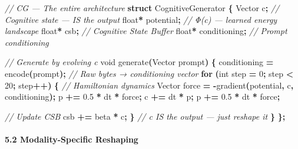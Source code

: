 \documentclass[
  11pt,
  a4paper,
]{article}
\newenvironment{Shaded}{\begin{snugshade}}{\end{snugshade}}
\newcommand{\CommentTok}[1]{\textcolor[rgb]{0.56,0.35,0.01}{\textit{#1}}}
\newcommand{\ControlFlowTok}[1]{\textcolor[rgb]{0.13,0.29,0.53}{\textbf{#1}}}
\newcommand{\DataTypeTok}[1]{\textcolor[rgb]{0.13,0.29,0.53}{#1}}
\newcommand{\DecValTok}[1]{\textcolor[rgb]{0.00,0.00,0.81}{#1}}
\newcommand{\FloatTok}[1]{\textcolor[rgb]{0.00,0.00,0.81}{#1}}
\newcommand{\KeywordTok}[1]{\textcolor[rgb]{0.13,0.29,0.53}{\textbf{#1}}}
\newcommand{\NormalTok}[1]{#1}
\newcommand{\OperatorTok}[1]{\textcolor[rgb]{0.81,0.36,0.00}{\textbf{#1}}}
\begin{document}
\begin{Shaded}
\begin{Highlighting}[]
\CommentTok{// CG — The entire architecture}
\KeywordTok{struct}\NormalTok{ CognitiveGenerator }\OperatorTok{\{}
\NormalTok{    Vector c}\OperatorTok{;}              \CommentTok{// Cognitive state — IS the output}
    \DataTypeTok{float}\OperatorTok{*}\NormalTok{ potential}\OperatorTok{;}      \CommentTok{// Φ(c) — learned energy landscape}
    \DataTypeTok{float}\OperatorTok{*}\NormalTok{ csb}\OperatorTok{;}            \CommentTok{// Cognitive State Buffer}
    \DataTypeTok{float}\OperatorTok{*}\NormalTok{ conditioning}\OperatorTok{;}   \CommentTok{// Prompt conditioning}
    
    \CommentTok{// Generate by evolving c}
    \DataTypeTok{void}\NormalTok{ generate}\OperatorTok{(}\NormalTok{Vector prompt}\OperatorTok{)} \OperatorTok{\{}
\NormalTok{        conditioning }\OperatorTok{=}\NormalTok{ encode}\OperatorTok{(}\NormalTok{prompt}\OperatorTok{);}  \CommentTok{// Raw bytes → conditioning vector}
        \ControlFlowTok{for} \OperatorTok{(}\DataTypeTok{int}\NormalTok{ step }\OperatorTok{=} \DecValTok{0}\OperatorTok{;}\NormalTok{ step }\OperatorTok{\textless{}} \DecValTok{20}\OperatorTok{;}\NormalTok{ step}\OperatorTok{++)} \OperatorTok{\{}
            \CommentTok{// Hamiltonian dynamics}
\NormalTok{            Vector force }\OperatorTok{=} \OperatorTok{{-}}\NormalTok{gradient}\OperatorTok{(}\NormalTok{potential}\OperatorTok{,}\NormalTok{ c}\OperatorTok{,}\NormalTok{ conditioning}\OperatorTok{);}
\NormalTok{            p }\OperatorTok{+=} \FloatTok{0.5} \OperatorTok{*}\NormalTok{ dt }\OperatorTok{*}\NormalTok{ force}\OperatorTok{;}
\NormalTok{            c }\OperatorTok{+=}\NormalTok{ dt }\OperatorTok{*}\NormalTok{ p}\OperatorTok{;}
\NormalTok{            p }\OperatorTok{+=} \FloatTok{0.5} \OperatorTok{*}\NormalTok{ dt }\OperatorTok{*}\NormalTok{ force}\OperatorTok{;}
            
            \CommentTok{// Update CSB}
\NormalTok{            csb }\OperatorTok{+=}\NormalTok{ beta }\OperatorTok{*}\NormalTok{ c}\OperatorTok{;}
        \OperatorTok{\}}
        \CommentTok{// c IS the output — just reshape it}
    \OperatorTok{\}}
\OperatorTok{\};}
\end{Highlighting}
\end{Shaded}

\paragraph{5.2 Modality-Specific
Reshaping}\label{modality-specific-reshaping}
\end{document}
